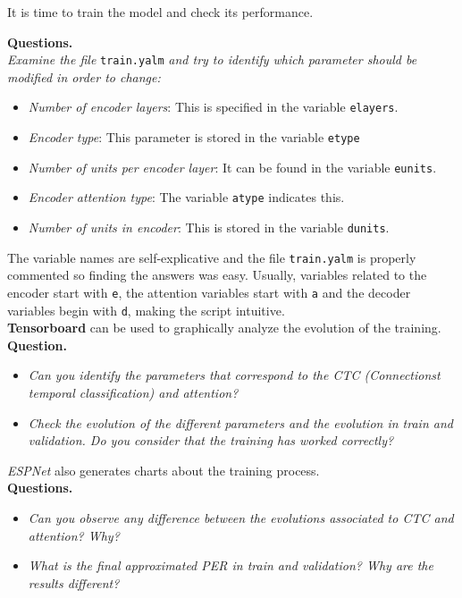 \documentclass[a4paper]{article}
\def\inline{\lstinline[basicstyle=\ttfamily,keywordstyle={}]}
\begin{document}
It is time to train the model and check its performance. 

\textbf{Questions.}\\

\emph{Examine the file} \inline{train.yalm} \emph{and try to identify which parameter should be modified in order to change:}
\begin{itemize}
  \item \emph{Number of encoder layers}: This is specified in the variable \inline{elayers}. 
  \item \emph{Encoder type}: This parameter is stored in the variable \inline{etype}
  \item \emph{Number of units per encoder layer}: It can be found in the variable \inline{eunits}.
  \item \emph{Encoder attention type}: The variable \inline{atype} indicates this.
  \item \emph{Number of units in encoder}: This is stored in the variable \inline{dunits}.

\end{itemize}
The variable names are self-explicative and the file \inline{train.yalm} is properly commented so finding the answers was easy. Usually, variables related to the encoder start with \inline{e}, the attention variables start with \inline{a} and the decoder variables begin with \inline{d}, making the script intuitive.\\

\textbf{Tensorboard} can be used to graphically analyze the evolution of the training.\\

\textbf{Question.}
\begin{itemize}
\item \emph{Can you identify the parameters that correspond to the CTC (Connectionst temporal classification) and attention?}
\item \emph{Check the evolution of the different parameters and the evolution in train and validation. Do you consider that the training has worked correctly? }
\end{itemize}

\emph{ESPNet} also generates charts about the training process.\\

\textbf{Questions.}
\begin{itemize}
\item \emph{Can you observe any difference between the evolutions associated to CTC and attention? Why?}
\item \emph{What is the final approximated PER in train and validation? Why are the results different? }
\end{itemize}
\end{document}
